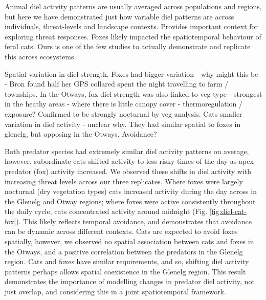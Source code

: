 \documentclass[11pt,a4paper,titlepage,twoside,openright]{style/unimelbthesis}
\begin{document}
\begin{mainmatter}
Animal diel activity patterns are usually averaged across populations and regions, but here we have demonstrated just how variable diel patterns are across individuals, threat-levels and landscape contexts. Provides important context for exploring threat responses. Foxes likely impacted the spatiotemporal behaviour of feral cats. Ours is one of the few studies to actually demonstrate and replicate this across ecosystems.

Spatial variation in diel strength. Foxes had bigger variation - why might this be - Bron found half her GPS collared spent the night travelling to farm / townships.
In the Otways, fox diel strength was also linked to veg type - strongest in the heathy areas - where there is little canopy cover - thermoregulation / exposure? Confirmed to be strongly nocturnal by veg analysis.
Cats smaller variation in diel activity - unclear why. They had similar spatial to foxes in glenelg, but opposing in the Otways. Avoidance?

Both predator species had extremely similar diel activity patterns on average, however, subordinate cats shifted activity to less risky times of the day as apex predator (fox) activity increased. We observed these shifts in diel activity with increasing threat levels across our three replicates. Where foxes were largely nocturnal (dry vegetation types) cats increased activity during the day across in the Glenelg and Otway regions; where foxes were active consistently throughout the daily cycle, cats concentrated activity around midnight (Fig. \ref{fig:diel-cat-fox}). This likely reflects temporal avoidance, and demonstrates that avoidance can be dynamic across different contexts. Cats are expected to avoid foxes spatially, however, we observed no spatial association between cats and foxes in the Otways, and a positive correlation between the predators in the Glenelg region. Cats and foxes have similar requirements, and so, shifting diel activity patterns perhaps allows spatial coexistence in the Glenelg region. This result demonstrates the importance of modelling changes in predator diel activity, not just overlap, and considering this in a joint spatiotemporal framework.


\end{mainmatter}
\end{document}
